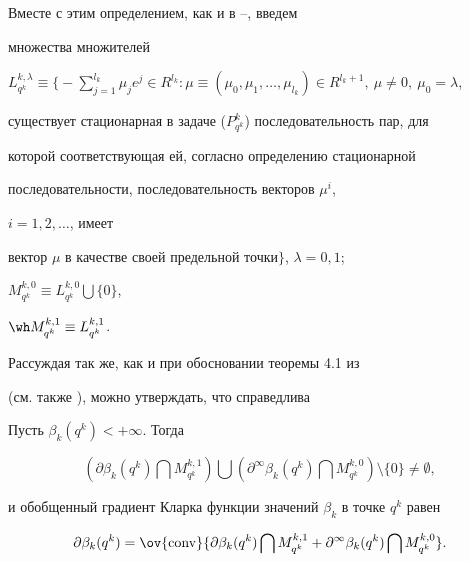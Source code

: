 Вместе с этим определением, как и в \cite{sumin95}--\cite{sumin97b}, введем


множества множителей





${L_{q^k}^{k,\lambda}}\equiv\Big\{-\sum\limits_{j=1}^{l_k}


\mu_je^j\in R^{l_k}: \mu\equiv(\mu_0,\mu_1,\dotsc,


\mu_{l_k})\in R^{l_k+1}, \ \mu\neq 0, \ \mu_0=\lambda$,


существует стационарная в задаче ($P^k_{q^k}$) последовательность пар, для


которой соответствующая ей, согласно определению стационарной


последовательности, последовательность векторов $\mu^i$,


$i=1,2,\dotsc$, имеет


вектор $\mu$ в качестве своей предельной точки$\Big\}$, $\lambda=0,1$;


${M_{q^k}^{k,0}}\equiv{L_{q^k}^{k,0}}\bigcup\{0\}$,


${\wh M_{q^k}^{k,1}}\equiv{L_{q^k}^{k,1}}$.





Рассуждая так же, как и при обосновании теоремы 4.1 из \cite{sumin97a}


(см. также \cite{sumin96}), можно утверждать, что справедлива





\begin{thms}\label{9t2}


Пусть $\beta_k(q^k)<+\infty$. Тогда


$$


(\partial\beta_k(q^k)\bigcap


{M_{q^k}^{k,1}})\bigcup(\partial^\infty\beta_k(q^k)


\bigcap{M_{q^k}^{k,0}})\setminus\{0\}\neq\emptyset,


$$


и обобщенный градиент Кларка функции значений $\beta_k$ в точке $q^k$ равен


$$


\partial\beta_k(q^k)=\ov{\conv}\{\partial\beta_k(q^k)\bigcap


{M_{q^k}^{k,1}}+\partial^\infty\beta_k(q^k)\bigcap


{M_{q^k}^{k,0}}\}.


$$


\end{thms}





